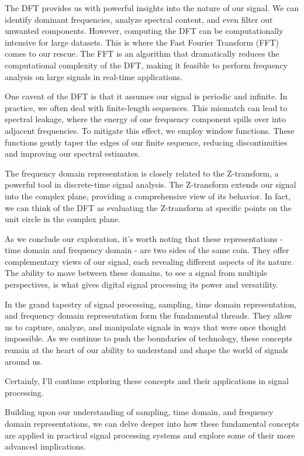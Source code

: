 The DFT provides us with powerful insights into the nature of our signal. We can identify dominant frequencies, analyze spectral content, and even filter out unwanted components. However, computing the DFT can be computationally intensive for large datasets. This is where the Fast Fourier Transform (FFT) comes to our rescue. The FFT is an algorithm that dramatically reduces the computational complexity of the DFT, making it feasible to perform frequency analysis on large signals in real-time applications.

One caveat of the DFT is that it assumes our signal is periodic and infinite. In practice, we often deal with finite-length sequences. This mismatch can lead to spectral leakage, where the energy of one frequency component spills over into adjacent frequencies. To mitigate this effect, we employ window functions. These functions gently taper the edges of our finite sequence, reducing discontinuities and improving our spectral estimates.

The frequency domain representation is closely related to the Z-transform, a powerful tool in discrete-time signal analysis. The Z-transform extends our signal into the complex plane, providing a comprehensive view of its behavior. In fact, we can think of the DFT as evaluating the Z-transform at specific points on the unit circle in the complex plane.

As we conclude our exploration, it's worth noting that these representations - time domain and frequency domain - are two sides of the same coin. They offer complementary views of our signal, each revealing different aspects of its nature. The ability to move between these domains, to see a signal from multiple perspectives, is what gives digital signal processing its power and versatility.

In the grand tapestry of signal processing, sampling, time domain representation, and frequency domain representation form the fundamental threads. They allow us to capture, analyze, and manipulate signals in ways that were once thought impossible. As we continue to push the boundaries of technology, these concepts remain at the heart of our ability to understand and shape the world of signals around us.

Certainly, I'll continue exploring these concepts and their applications in signal processing.

Building upon our understanding of sampling, time domain, and frequency domain representations, we can delve deeper into how these fundamental concepts are applied in practical signal processing systems and explore some of their more advanced implications.

